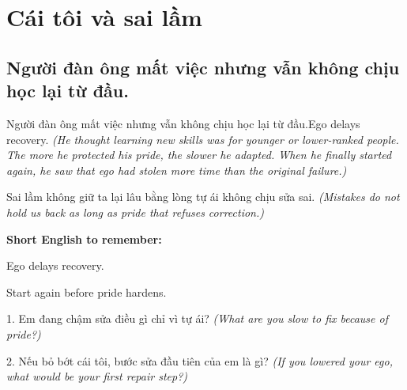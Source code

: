 \chapter{Cái tôi và sai lầm}

\section{Người đàn ông mất việc nhưng vẫn không chịu học lại từ đầu.}
\begin{truyen}{Người đàn ông mất việc nhưng vẫn không chịu học lại từ đầu.}{Ego delays recovery.}
\textit{(He thought learning new skills was for younger or lower-ranked people. The more he protected his pride, the slower he adapted. When he finally started again, he saw that ego had stolen more time than the original failure.)}
\end{truyen}
\begin{baihoc}
Sai lầm không giữ ta lại lâu bằng lòng tự ái không chịu sửa sai.
\textit{(Mistakes do not hold us back as long as pride that refuses correction.)}
\end{baihoc}
\begin{ghinhoanh}
\textbf{Short English to remember:}

Ego delays recovery.

Start again before pride hardens.
\end{ghinhoanh}
\begin{tuhocnhanh}
1. Em đang chậm sửa điều gì chỉ vì tự ái? \textit{(What are you slow to fix because of pride?)}

2. Nếu bỏ bớt cái tôi, bước sửa đầu tiên của em là gì? \textit{(If you lowered your ego, what would be your first repair step?)}
\end{tuhocnhanh}
\ngancach

